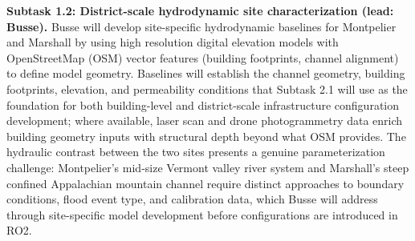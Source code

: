 \documentclass[11pt]{article}
\begin{document}
\textbf{Subtask 1.2: District-scale hydrodynamic site characterization (lead: Busse).}
Busse will develop site-specific hydrodynamic baselines for Montpelier and Marshall
by using high resolution digital elevation models with OpenStreetMap (OSM) vector
features (building footprints, channel alignment) to define model geometry.
Baselines will establish the channel geometry, building footprints, elevation, and
permeability conditions that Subtask 2.1 will use as the foundation for both
building-level and district-scale infrastructure configuration development; where
available, laser scan and drone photogrammetry data enrich building geometry inputs
with structural depth beyond what OSM provides.
The hydraulic contrast between the two sites presents a genuine parameterization
challenge: Montpelier's mid-size Vermont valley river system and Marshall's steep
confined Appalachian mountain channel require distinct approaches to boundary
conditions, flood event type, and calibration data, which Busse will address
through site-specific model development before configurations are introduced in RO2.

\end{document}
